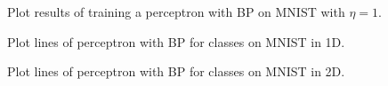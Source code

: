 \documentclass[journal]{IEEEtran}
\begin{document}
\begin{figure}[H]
	\centering
	\caption{Plot results of training a perceptron with BP on MNIST with $\eta=1$.}
	\label{fig:mnistperceptronbp}
\end{figure}

\begin{figure}[H]
	\centering
	\caption{Plot lines of perceptron with BP for classes on MNIST in 1D.}
	\label{fig:mnistperceptronlinebp1dpca}
\end{figure}

\begin{figure}[H]
	\centering
	\caption{Plot lines of perceptron with BP for classes on MNIST in 2D.}
	\label{fig:mnistperceptronlinebp2dpca}
\end{figure}
\end{document}
